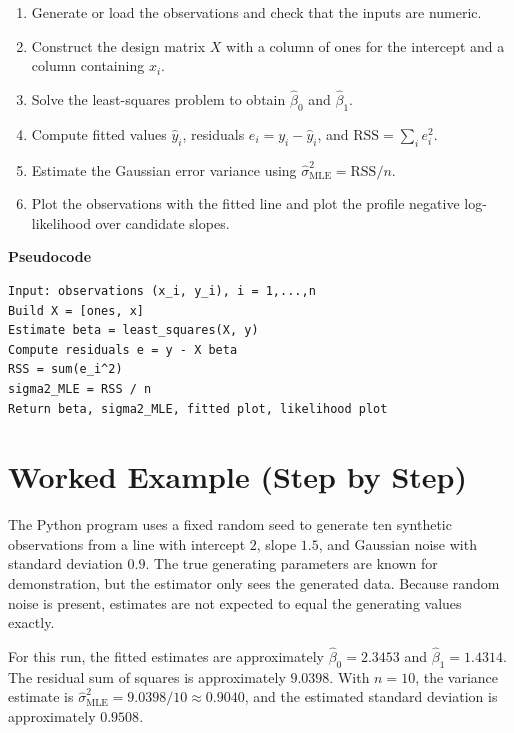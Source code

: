 \documentclass[11pt,a4paper]{article}
\begin{document}
\begin{enumerate}
\item Generate or load the observations and check that the inputs are numeric.
\item Construct the design matrix $X$ with a column of ones for the intercept and a column containing $x_i$.
\item Solve the least-squares problem to obtain $\widehat{\beta}_0$ and $\widehat{\beta}_1$.
\item Compute fitted values $\widehat{y}_i$, residuals $e_i=y_i-\widehat{y}_i$, and $\mathrm{RSS}=\sum_i e_i^2$.
\item Estimate the Gaussian error variance using $\widehat{\sigma}^2_{\mathrm{MLE}}=\mathrm{RSS}/n$.
\item Plot the observations with the fitted line and plot the profile negative log-likelihood over candidate slopes.
\end{enumerate}

\noindent\textbf{Pseudocode}
\begin{lstlisting}[basicstyle=\ttfamily\small,frame=single,breaklines=true]
Input: observations (x_i, y_i), i = 1,...,n
Build X = [ones, x]
Estimate beta = least_squares(X, y)
Compute residuals e = y - X beta
RSS = sum(e_i^2)
sigma2_MLE = RSS / n
Return beta, sigma2_MLE, fitted plot, likelihood plot
\end{lstlisting}

\section{Worked Example (Step by Step)}
The Python program uses a fixed random seed to generate ten synthetic observations from a line with intercept $2$, slope $1.5$, and Gaussian noise with standard deviation $0.9$. The true generating parameters are known for demonstration, but the estimator only sees the generated data. Because random noise is present, estimates are not expected to equal the generating values exactly.

For this run, the fitted estimates are approximately $\widehat{\beta}_0=2.3453$ and $\widehat{\beta}_1=1.4314$. The residual sum of squares is approximately $9.0398$. With $n=10$, the variance estimate is $\widehat{\sigma}^2_{\mathrm{MLE}}=9.0398/10\approx0.9040$, and the estimated standard deviation is approximately $0.9508$.
\end{document}
